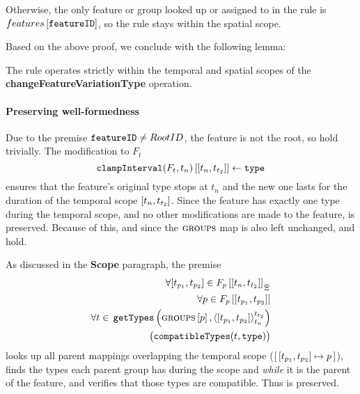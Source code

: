 Otherwise, the only feature or group looked up or assigned to in the rule is $features \left[ \texttt{featureID} \right]$, so the rule stays within the spatial scope.

Based on the above proof, we conclude with the following lemma:
\\

\begin{lemma}
   The  rule operates strictly within the temporal and spatial scopes of the \textbf{changeFeatureVariationType} operation.
   \label{lemma:change-feature-variation-type-scope}
\end{lemma}

\paragraph{Preserving well-formedness}
Due to the premise $\texttt{featureID} \neq RootID$, the feature is not the root, so  hold trivially. The modification to $F_t$
\[
   \lookup{\var{clampInterval}(F_t, t_n)}{\interval{t_n}{t_{t_2}}} \assign \var{type}
\]
ensures that the feature's original type stops at $t_n$ and the new one lasts for the duration of the temporal scope $\interval{t_n}{t_{t_2}}$. Since the feature has exactly one type during the temporal scope, and no other modifications are made to the feature,  is preserved. Because of this, and since the $\textsc{groups}{}{}$ map is also left unchanged,  and  hold. 

As discussed in the \textbf{Scope} paragraph, the premise 
\[
   \begin{split}
      \forall \interval{t_{p_1}}{t_{p_2}} \in \overlapping{F_p}{t_n}{t_{t_2}}  \\ %
      \forall p \in \lookup{F_p}{\interval{t_{p_1}}{t_{p_2}}}  \\%
      \forall t \in \, \var{getTypes}\left(\lookup{\groups}{p}, \clamp{\interval{t_{p_1}}{t_{p_2}}}{t_n}{t_{t_2}}\right)  \\
          \big(\var{compatibleTypes}(t, \var{type})\big) 
    \end{split}
\]
looks up all parent mappings overlapping the temporal scope ($\intervalmapping{t_{p_1}}{t_{p_2}}{p}$), finds the types each parent group has during the scope and \emph{while} it is the parent of the feature, and verifies that those types are compatible. Thus  is preserved.

